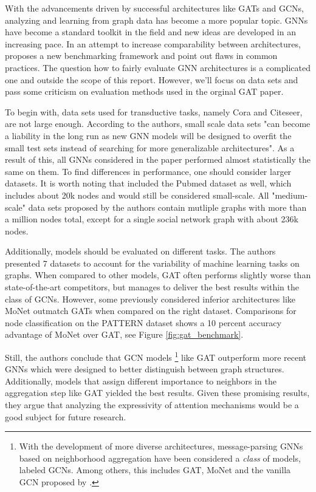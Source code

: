 \label{chapter:related_work}

With the advancements driven by successful architectures like GATs and GCNs, analyzing and learning from graph data has become a more popular topic. GNNs have become a standard toolkit in the field and new ideas are developed in an increasing pace. In an attempt to increase comparability between architectures, \cite{dwivedi2020benchmarking} proposes a new benchmarking framework and point out flaws in common practices. The question how to fairly evaluate GNN architectures is a complicated one and outside the scope of this report. However, we'll focus on data sets and pass some criticism on evaluation methods used in the orginal GAT paper.

To begin with, data sets used for transductive tasks, namely Cora and Citeseer, are not large enough. According to the authors, small scale data sets "can become a liability in the long run as new GNN models will be designed to overfit the small test sets instead of searching for more generalizable architectures". As a result of this, all GNNs considered in the paper performed almost statistically the same on them. To find differences in performance, one should consider larger datasets. It is worth noting that \cite{velickovic2018graph} included the Pubmed dataset as well, which includes about 20k nodes and would still be considered small-scale. All "medium-scale" data sets proposed by the authors contain mutliple graphs with more than a million nodes total, except for a single social network graph with about 236k nodes.

Additionally, models should be evaluated on different tasks.  The authors presented 7 datasets to account for the variability of machine learning tasks on graphs. When compared to other models, GAT often performs slightly worse than state-of-the-art competitors, but manages to deliver the best results within the class of GCNs. However, some previously considered inferior architectures like MoNet outmatch GATs when compared on the right dataset. Comparisons for node classification on the PATTERN dataset shows a 10 percent accuracy advantage of MoNet over GAT, see Figure \ref{fig:gat_benchmark}.


Still, the authors conclude that GCN models \footnote{With the development of more diverse architectures, message-parsing GNNs based on neighborhood aggregation have been considered a \textit{class} of models, labeled GCNs. Among others, this includes GAT, MoNet and the vanilla GCN proposed by \cite{kipf2017semisupervised}.} like GAT outperform more recent GNNs which were designed to better distinguish between graph structures. Additionally, models that assign different importance to neighbors in the aggregation step like GAT yielded the best results. Given these promising results, they argue that analyzing the expressivity of attention mechanisms would be a good subject for future research.

